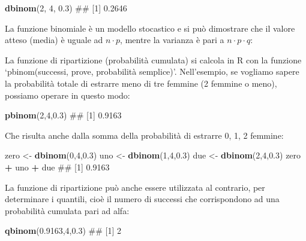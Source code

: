 \documentclass[a4paper,12pt,oneside]{book}
\newenvironment{Shaded}{\begin{snugshade}}{\end{snugshade}}
\newcommand{\KeywordTok}[1]{\textcolor[rgb]{0.13,0.29,0.53}{\textbf{#1}}}
\newcommand{\DecValTok}[1]{\textcolor[rgb]{0.00,0.00,0.81}{#1}}
\newcommand{\FloatTok}[1]{\textcolor[rgb]{0.00,0.00,0.81}{#1}}
\newcommand{\StringTok}[1]{\textcolor[rgb]{0.31,0.60,0.02}{#1}}
\newcommand{\OperatorTok}[1]{\textcolor[rgb]{0.81,0.36,0.00}{\textbf{#1}}}
\newcommand{\NormalTok}[1]{#1}
\theoremstyle{definition}
\theoremstyle{definition}
\theoremstyle{definition}
\theoremstyle{remark}
\begin{document}
\begin{Shaded}
\begin{Highlighting}[]
\KeywordTok{dbinom}\NormalTok{(}\DecValTok{2}\NormalTok{, }\DecValTok{4}\NormalTok{, }\FloatTok{0.3}\NormalTok{)}
\NormalTok{## [1] 0.2646}
\end{Highlighting}
\end{Shaded}

La funzione binomiale è un modello stocastico e si può dimostrare che il
valore atteso (media) è uguale ad \(n\cdot p\), mentre la varianza è
pari a \(n\cdot p \cdot q\):

La funzione di ripartizione (probabilità cumulata) si calcola in R con
la funzione `pbinom(successi, prove, probabilità semplice)'.
Nell'esempio, se vogliamo sapere la probabilità totale di estrarre meno
di tre femmine (2 femmine o meno), possiamo operare in questo modo:

\begin{Shaded}
\begin{Highlighting}[]
\KeywordTok{pbinom}\NormalTok{(}\DecValTok{2}\NormalTok{,}\DecValTok{4}\NormalTok{,}\FloatTok{0.3}\NormalTok{)}
\NormalTok{## [1] 0.9163}
\end{Highlighting}
\end{Shaded}

Che risulta anche dalla somma della probabilità di estrarre 0, 1, 2
femmine:

\begin{Shaded}
\begin{Highlighting}[]
\NormalTok{zero <-}\StringTok{ }\KeywordTok{dbinom}\NormalTok{(}\DecValTok{0}\NormalTok{,}\DecValTok{4}\NormalTok{,}\FloatTok{0.3}\NormalTok{)}
\NormalTok{uno <-}\StringTok{ }\KeywordTok{dbinom}\NormalTok{(}\DecValTok{1}\NormalTok{,}\DecValTok{4}\NormalTok{,}\FloatTok{0.3}\NormalTok{)}
\NormalTok{due <-}\StringTok{ }\KeywordTok{dbinom}\NormalTok{(}\DecValTok{2}\NormalTok{,}\DecValTok{4}\NormalTok{,}\FloatTok{0.3}\NormalTok{)}
\NormalTok{zero }\OperatorTok{+}\StringTok{ }\NormalTok{uno }\OperatorTok{+}\StringTok{ }\NormalTok{due}
\NormalTok{## [1] 0.9163}
\end{Highlighting}
\end{Shaded}

La funzione di ripartizione può anche essere utilizzata al contrario,
per determinare i quantili, cioè il numero di successi che corrispondono
ad una probabilità cumulata pari ad alfa:

\begin{Shaded}
\begin{Highlighting}[]
\KeywordTok{qbinom}\NormalTok{(}\FloatTok{0.9163}\NormalTok{,}\DecValTok{4}\NormalTok{,}\FloatTok{0.3}\NormalTok{)}
\NormalTok{## [1] 2}
\end{Highlighting}
\end{Shaded}
\end{document}
